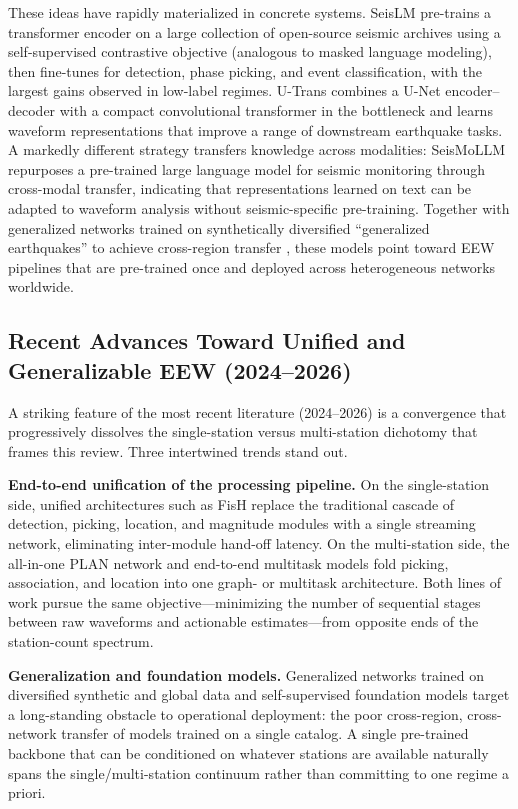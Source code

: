 \documentclass[review,authoryear]{elsarticle}
\begin{document}
These ideas have rapidly materialized in concrete systems. SeisLM \citep{liu2024seislm} pre-trains a transformer encoder on a large collection of open-source seismic archives using a self-supervised contrastive objective (analogous to masked language modeling), then fine-tunes for detection, phase picking, and event classification, with the largest gains observed in low-label regimes. U-Trans \citep{saad2026utrans} combines a U-Net encoder--decoder with a compact convolutional transformer in the bottleneck and learns waveform representations that improve a range of downstream earthquake tasks. A markedly different strategy transfers knowledge across modalities: SeisMoLLM \citep{wang2025seismollm} repurposes a pre-trained large language model for seismic monitoring through cross-modal transfer, indicating that representations learned on text can be adapted to waveform analysis without seismic-specific pre-training. Together with generalized networks trained on synthetically diversified ``generalized earthquakes'' to achieve cross-region transfer \citep{zhang2024universal}, these models point toward EEW pipelines that are pre-trained once and deployed across heterogeneous networks worldwide.

\subsection{Recent Advances Toward Unified and Generalizable EEW (2024--2026)}
\label{sec:recent_advances}

A striking feature of the most recent literature (2024--2026) is a convergence that progressively dissolves the single-station versus multi-station dichotomy that frames this review. Three intertwined trends stand out.

\textbf{End-to-end unification of the processing pipeline.} On the single-station side, unified architectures such as FisH \citep{zhang2024fish} replace the traditional cascade of detection, picking, location, and magnitude modules with a single streaming network, eliminating inter-module hand-off latency. On the multi-station side, the all-in-one PLAN network \citep{si2024plan} and end-to-end multitask models \citep{zhu2025phasenetplus} fold picking, association, and location into one graph- or multitask architecture. Both lines of work pursue the same objective---minimizing the number of sequential stages between raw waveforms and actionable estimates---from opposite ends of the station-count spectrum.

\textbf{Generalization and foundation models.} Generalized networks trained on diversified synthetic and global data \citep{zhang2024universal} and self-supervised foundation models \citep{liu2024seislm, wang2025seismollm, saad2026utrans} target a long-standing obstacle to operational deployment: the poor cross-region, cross-network transfer of models trained on a single catalog. A single pre-trained backbone that can be conditioned on whatever stations are available naturally spans the single/multi-station continuum rather than committing to one regime a priori.
\end{document}
